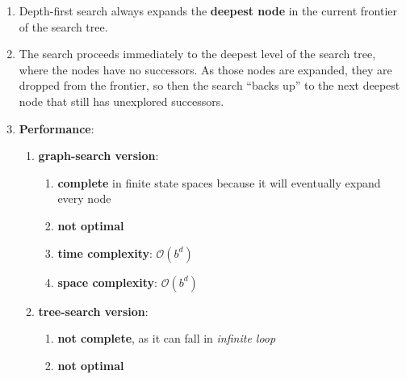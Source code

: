 \begin{enumerate}[itemsep=0.2cm]
    \item Depth-first search always expands the \textbf{deepest node} in the current frontier of the search tree.
    \hfill \cite{ai/book/Artificial-Intelligence-A-Modern-Approach/Russell-Norvig}

    \item The search proceeds immediately to the deepest level of the search tree, where the nodes have no successors. As those nodes are expanded, they are dropped from the frontier, so then the search “backs up” to the next deepest node that still has unexplored successors.
    \hfill \cite{ai/book/Artificial-Intelligence-A-Modern-Approach/Russell-Norvig}

    \item \textbf{Performance}:
    \begin{enumerate}[itemsep=0.2cm]
        \item \textbf{graph-search version}:
        \begin{enumerate}[itemsep=0.2cm]
            \item \textbf{complete} in finite state spaces because it will eventually expand every node
            \hfill \cite{ai/book/Artificial-Intelligence-A-Modern-Approach/Russell-Norvig}

            \item \textbf{not optimal}
            \hfill \cite{ai/book/Artificial-Intelligence-A-Modern-Approach/Russell-Norvig}

            \item \textbf{time complexity}: $\mathcal{O}(b^d)$
            \hfill \cite{ai/book/Artificial-Intelligence-A-Modern-Approach/Russell-Norvig}

            \item \textbf{space complexity}: $\mathcal{O}(b^d)$
            \hfill \cite{ai/book/Artificial-Intelligence-A-Modern-Approach/Russell-Norvig}
        \end{enumerate}

        \item \textbf{tree-search version}:
        \begin{enumerate}[itemsep=0.2cm]
            \item \textbf{not complete}, as it can fall in \textit{infinite loop}
            \hfill \cite{ai/book/Artificial-Intelligence-A-Modern-Approach/Russell-Norvig}

            \item \textbf{not optimal}
            \hfill \cite{ai/book/Artificial-Intelligence-A-Modern-Approach/Russell-Norvig}


\end{enumerate}
\end{enumerate}
\end{enumerate}
